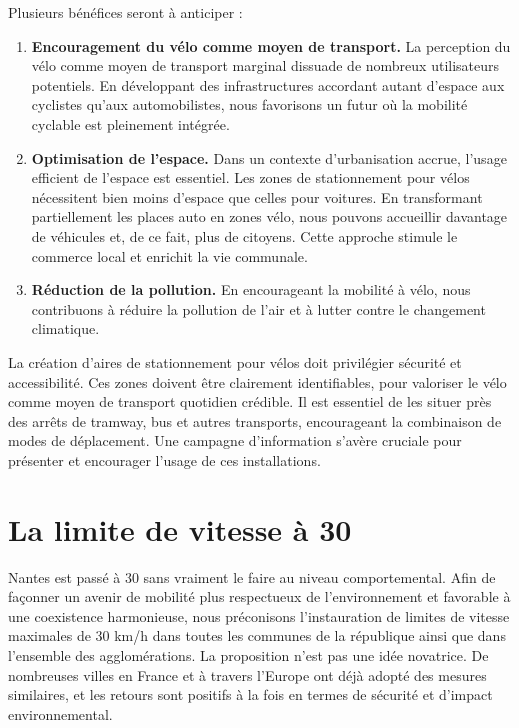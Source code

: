 Plusieurs bénéfices seront à anticiper :
\begin{enumerate}
\item \textbf{Encouragement du vélo comme moyen de transport.} La
  perception du vélo comme moyen de transport marginal dissuade de
  nombreux utilisateurs potentiels. En développant des infrastructures
  accordant autant d'espace aux cyclistes qu'aux automobilistes, nous
  favorisons un futur où la mobilité cyclable est pleinement intégrée.
\item \textbf{Optimisation de l'espace.} Dans un contexte d'urbanisation
  accrue, l'usage efficient de l'espace est essentiel. Les zones de
  stationnement pour vélos nécessitent bien moins d'espace que celles
  pour voitures. En transformant partiellement les places auto en
  zones vélo, nous pouvons accueillir davantage de véhicules et, de ce
  fait, plus de citoyens. Cette approche stimule le commerce local et
  enrichit la vie communale.
\item \textbf{Réduction de la pollution.} En encourageant la mobilité
  à vélo, nous contribuons à réduire la pollution de l'air et à lutter
  contre le changement climatique.
\end{enumerate}

\medskip

La création d'aires de stationnement pour vélos doit privilégier
sécurité et accessibilité. Ces zones doivent être clairement
identifiables, pour valoriser le vélo comme moyen de transport
quotidien crédible. Il est essentiel de les situer près des arrêts de
tramway, bus et autres transports, encourageant la combinaison de
modes de déplacement. Une campagne d'information s'avère cruciale pour
présenter et encourager l'usage de ces installations.


\section{La limite de vitesse à 30}

Nantes est passé à 30 sans vraiment le faire au niveau
comportemental. Afin de façonner un avenir de mobilité plus
respectueux de l'environnement et favorable à une coexistence
harmonieuse, nous préconisons l'instauration de limites de vitesse
maximales de 30 km/h dans toutes les communes de la république ainsi
que dans l'ensemble des agglomérations. La proposition n'est pas une
idée novatrice. De nombreuses villes en France et à travers l'Europe
ont déjà adopté des mesures similaires, et les retours sont positifs à
la fois en termes de sécurité et d'impact environnemental.


